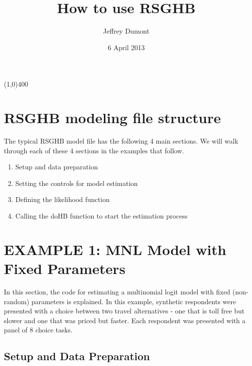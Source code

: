 \documentclass{article}\usepackage{graphicx, color}
\begin{document}
\title{How to use RSGHB}
\author{Jeffrey Dumont}
\date{6 April 2013}
\maketitle
{}

\begin{center}
\line(1,0){400}
\end{center}

\section*{RSGHB modeling file structure}

The typical RSGHB model file has the following 4 main sections. We will walk through each of these 4 sections in the examples that follow.

\begin{enumerate}
     \item Setup and data preparation
     \item Setting the controls for model estimation
     \item Defining the likelihood function
     \item Calling the doHB function to start the estimation process
\end{enumerate}

\section*{EXAMPLE 1: MNL Model with Fixed Parameters}

In this section, the code for estimating a multinomial logit model with fixed (non-random) parameters is explained. In this example, synthetic respondents were presented with a choice between two travel alternatives - one that is toll free but slower and one that was priced but faster. Each respondent was presented with a panel of 8 choice tasks.

\subsection*{Setup and Data Preparation}
\end{document}
